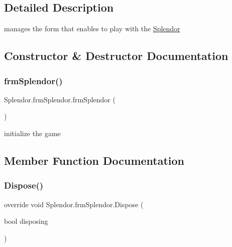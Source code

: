 \subsection{Detailed Description}
manages the form that enables to play with the \mbox{\hyperlink{namespace_splendor}{Splendor}} 



\subsection{Constructor \& Destructor Documentation}
\mbox{\label{class_splendor_1_1frm_splendor_ad9c938893d23192acb1996053e3ea87b}} 
\subsubsection{\texorpdfstring{frm\+Splendor()}{frmSplendor()}}
{\footnotesize\ttfamily Splendor.\+frm\+Splendor.\+frm\+Splendor (\begin{DoxyParamCaption}{ }\end{DoxyParamCaption})}



initialize the game 



\subsection{Member Function Documentation}
\mbox{\label{class_splendor_1_1frm_splendor_a749f4f1d67c78e74aa1a55aa6fdd754b}} 
\subsubsection{\texorpdfstring{Dispose()}{Dispose()}}
{\footnotesize\ttfamily override void Splendor.\+frm\+Splendor.\+Dispose (\begin{DoxyParamCaption}\item[{bool}]{disposing }\end{DoxyParamCaption})\hspace{0.3cm}{\ttfamily [protected]}}



